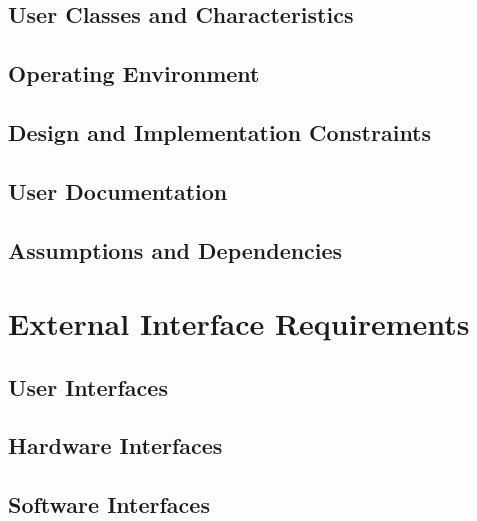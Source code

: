 \documentclass{article}
\begin{document}
\subsection{User Classes and Characteristics}

\subsection{Operating Environment}

\subsection{Design and Implementation Constraints}

\subsection{User Documentation}

\subsection{Assumptions and Dependencies}

\newpage
\section{External Interface Requirements}
\subsection{User Interfaces}

\subsection{Hardware Interfaces}

\subsection{Software Interfaces}
\end{document}
